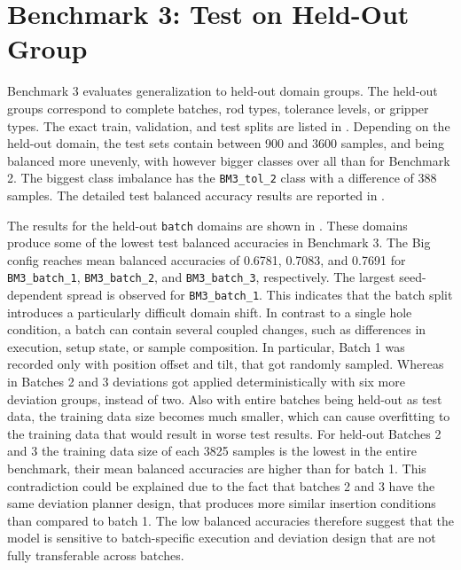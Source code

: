 \newpage

\section{Benchmark 3: Test on Held-Out Group}
\label{sec:results_benchmark3}

Benchmark 3 evaluates generalization to held-out domain groups. The held-out groups correspond to complete batches, rod types, tolerance levels, or gripper types. The exact train, validation, and test splits are listed in . Depending on the held-out domain, the test sets contain between 900 and 3600 samples, and being balanced more unevenly, with however bigger classes over all than for Benchmark 2. The biggest class imbalance has the \texttt{BM3\_tol\_2} class with a difference of 388 samples. The detailed test balanced accuracy results are reported in .

The results for the held-out \texttt{batch} domains are shown in . These domains produce some of the lowest test balanced accuracies in Benchmark 3. The Big config reaches mean balanced accuracies of 0.6781, 0.7083, and 0.7691 for \texttt{BM3\_batch\_1}, \texttt{BM3\_batch\_2}, and \texttt{BM3\_batch\_3}, respectively. The largest seed-dependent spread is observed for \texttt{BM3\_batch\_1}. This indicates that the batch split introduces a particularly difficult domain shift. In contrast to a single hole condition, a batch can contain several coupled changes, such as differences in execution, setup state, or sample composition. In particular, Batch 1 was recorded only with position offset and tilt, that got randomly sampled. Whereas in Batches 2 and 3 deviations got applied deterministically with six more deviation groups, instead of two. Also with entire batches being held-out as test data, the training data size becomes much smaller, which can cause overfitting to the training data that would result in worse test results. For held-out Batches 2 and 3 the training data size of each 3825 samples is the lowest in the entire benchmark, their mean balanced accuracies are higher than for batch 1. This contradiction could be explained due to the fact that batches 2 and 3 have the same deviation planner design, that produces more similar insertion conditions than compared to batch 1. The low balanced accuracies therefore suggest that the model is sensitive to batch-specific execution and deviation design that are not fully transferable across batches.

